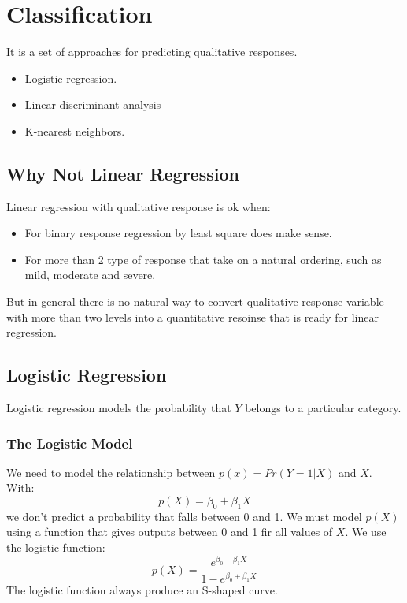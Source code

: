 \documentclass[a4paper]{article}
\begin{document}
	\section{Classification}
		It is a set of approaches for predicting qualitative responses.
		\begin{itemize}
			\item Logistic regression.
			\item Linear discriminant analysis
			\item K-nearest neighbors.
		\end{itemize}
	
	\subsection{Why Not Linear Regression}
		Linear regression with qualitative response is ok when:
		\begin{itemize}
			\item For binary response regression by least square does make sense.
			\item For more than 2 type of response that take on a natural ordering, such as mild, moderate and severe.
		\end{itemize}
		But in general there is no natural way to convert qualitative response variable with more than two levels into a quantitative resoinse that is ready for linear regression.
		
	
	\subsection{Logistic Regression}
		Logistic regression models the probability that $Y$ belongs to a particular category.
	
		\subsubsection{The Logistic Model}
			We need to model the relationship between $p(x)=Pr(Y=1|X)$ and $X$.
			With:
			\begin{equation}
				p(X) = \beta_0 + \beta_1 X
			\end{equation}
			we don't predict a probability that falls between 0 and 1. We must model $p(X)$ using a function that gives outputs between 0 and 1 fir all values of $X$. We use the logistic function:
			\begin{equation}
				p(X) = \frac{e^{\beta_0 + \beta_1 X}}{1 - e^{\beta_0 + \beta_1 X}}
			\end{equation}
			The logistic function always produce an S-shaped curve.
			
\end{document}
